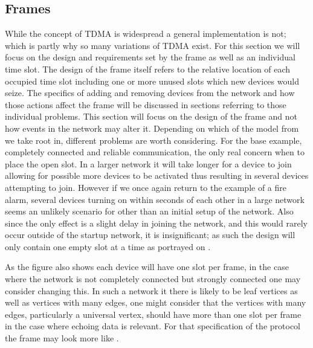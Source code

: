 \subsection{Frames}
While the concept of TDMA is widespread a general implementation is not; which is partly why so many variations of TDMA exist.
For this section we will focus on the design and requirements set by the frame as well as an individual time slot.
The design of the frame itself refers to the relative location of each occupied time slot including one or more unused slots which new devices would seize.
The specifics of adding and removing devices from the network and how those actions affect the frame will be discussed in sections referring to those individual problems.
This section will focus on the design of the frame and not how events in the network may alter it.
Depending on which of the model from  we take root in, different problems are worth considering.
For the base example, completely connected and reliable communication, the only real concern when to place the open slot.
In a larger network it will take longer for a device to join allowing for possible more devices to be activated thus resulting in several devices attempting to join.
However if we once again return to the example of a fire alarm, several devices turning on within seconds of each other in a large network seems an unlikely scenario for other than an initial setup of the network.
Also since the only effect is a slight delay in joining the network, and this would rarely occur outside of the startup network, it is insignificant; as such the design will only contain one empty slot at a time as portrayed on .

\bigskip \noindent
As the figure also shows each device will have one slot per frame, in the case where the network is not completely connected but strongly connected one may consider changing this.
In such a network it there is likely to be leaf vertices as well as vertices with many edges, one might consider that the vertices with many edges, particularly a universal vertex, should have more than one slot per frame in the case where echoing data is relevant.
For that specification of the protocol the frame may look more like .

